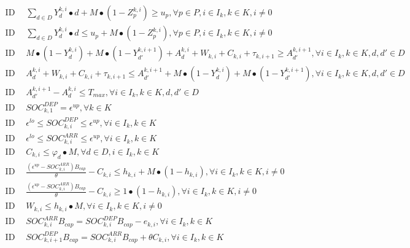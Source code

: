 \documentclass[10pt]{article}
\begin{document}
\begin{align}
    \text{ID 12: } & \sum_{d \in D} Y_{d}^{k,i} \bullet d + M \bullet (1 - Z_{p}^{k,i}) \geq u_p, \forall p \in P, i \in I_k, k \in K, i \neq 0 \tag{12} \\
    \text{ID 13: } & \sum_{d \in D} Y_{d}^{k,i} \bullet d \leq u_p + M \bullet (1 - Z_{p}^{k,i}), \forall p \in P, i \in I_k, k \in K, i \neq 0 \tag{13} \\
    \text{ID 14: } & M \bullet (1 - Y_{d}^{k,i}) + M \bullet (1 - Y_{d'}^{k,i+1}) + A_{d}^{k,i} + W_{k,i} + C_{k,i} + \tau_{k,i+1} \geq A_{d'}^{k,i+1}, \forall i \in I_k, k \in K, d, d' \in D \tag{14} \\
    \text{ID 15: } & A_{d}^{k,i} + W_{k,i} + C_{k,i} + \tau_{k,i+1} \leq A_{d'}^{k,i+1} + M \bullet (1 - Y_{d}^{k,i}) + M \bullet (1 - Y_{d'}^{k,i+1}), \forall i \in I_k, k \in K, d, d' \in D \tag{15} \\
    \text{ID 16: } & A_{d'}^{k,i+1} - A_{d}^{k,i} \leq T_{max}, \forall i \in I_k, k \in K, d, d' \in D \tag{16} \\
    \text{ID 17: } & SOC_{k,1}^{DEP} = \epsilon^{up}, \forall k \in K \tag{17} \\
    \text{ID 18: } & \epsilon^{lo} \leq SOC_{k,i}^{DEP} \leq \epsilon^{up}, \forall i \in I_k, k \in K \tag{18} \\
    \text{ID 19: } & \epsilon^{lo} \leq SOC_{k,i}^{ARR} \leq \epsilon^{up}, \forall i \in I_k, k \in K \tag{19} \\
    \text{ID 20: } & C_{k,i} \leq \varphi_d \bullet M, \forall d \in D, i \in I_k, k \in K \tag{20} \\
    \text{ID 21: } & \frac{(\epsilon^{up} - SOC_{k,i}^{ARR})B_{cap}}{\theta} - C_{k,i} \leq h_{k,i} + M \bullet (1 - h_{k,i}), \forall i \in I_k, k \in K, i \neq 0 \tag{21} \\
    \text{ID 22: } & \frac{(\epsilon^{up} - SOC_{k,i}^{ARR})B_{cap}}{\theta} - C_{k,i} \geq 1 \bullet (1 - h_{k,i}), \forall i \in I_k, k \in K, i \neq 0 \tag{22} \\
    \text{ID 23: } & W_{k,i} \leq h_{k,i} \bullet M, \forall i \in I_k, k \in K, i \neq 0 \tag{23} \\
    \text{ID 24: } & SOC_{k,i}^{ARR} B_{cap} = SOC_{k,i}^{DEP} B_{cap} - e_{k,i}, \forall i \in I_k, k \in K \tag{24} \\
    \text{ID 25: } & SOC_{k,i+1}^{DEP} B_{cap} = SOC_{k,i}^{ARR} B_{cap} + \theta C_{k,i}, \forall i \in I_k, k \in K \tag{25}
\end{align}
\end{document}
